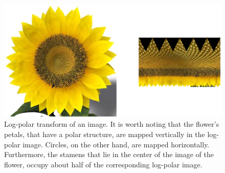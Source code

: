 \documentclass{llncs}
\begin{document}
\begin{figure}[t]
	\begin{center}
		\includegraphics[width=0.7\linewidth]{./figs/attention/logpolarmapping2}
    \caption{Log-polar transform of an image.
    It is worth noting that the flower's petals, that have a polar structure,
    are mapped vertically in the log-polar image. Circles, on the other
    hand, are mapped horizontally. Furthermore, the stamens that lie in the
    center of the image of the flower, occupy about half of the
    corresponding log-polar image.}
  	\label{fig:logpolar_ex}
	\end{center}
\end{figure}
\end{document}
